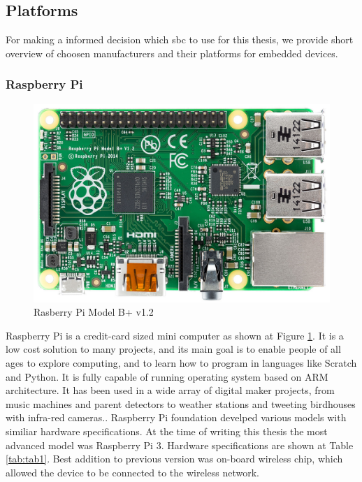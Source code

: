 \subsection{Platforms} %
\label{sub:platforms}
For making a informed decision which \gls{sbc} to use for this thesis, we provide short overview of choosen manufacturers and their platforms for embedded devices.
\subsubsection{Raspberry Pi} %
\label{ssub:raspberry_pi}
\begin{figure}[H]
\begin{center}
\captionsetup{font=small}
\includegraphics[scale=0.2]{pics/rasp.jpg}
\caption{Rasberry Pi Model B+ v1.2 \cite{pi_pic}}
\label{fig:ch3}
\end{center}
\end{figure}
Raspberry Pi is a credit-card sized mini computer as shown at Figure \ref{fig:ch3}. It is a low cost solution to many projects, and its main goal is to enable people of all ages to explore computing, and to learn how to program in languages like Scratch and Python. It is fully capable of running operating system based on ARM architecture. It has been used in a wide array of digital maker projects, from music machines and parent detectors to weather stations and tweeting birdhouses with infra-red cameras.\cite{raspberry_pi_what}. Raspberry Pi foundation develped various models with similiar hardware specifications. At the time of writing this thesis the most advanced model was Raspberry Pi 3. Hardware specifications are shown at Table \ref{tab:tab1}. Best addition to previous version was on-board wireless chip, which allowed the device to be connected to the wireless network.

